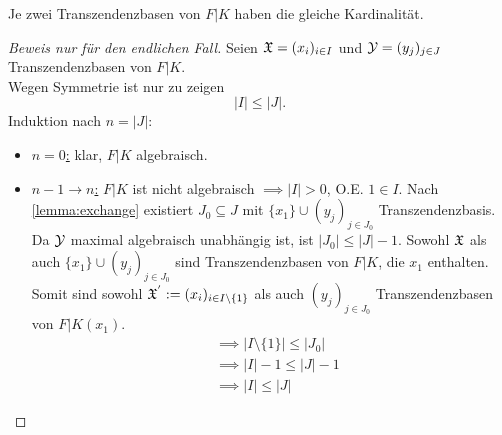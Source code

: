 \begin{satz}[Steinitz, 1910]
    Je zwei Transzendenzbasen von $F|K$ haben die gleiche Kardinalität.
\end{satz}

\begin{proof}[Beweis nur für den endlichen Fall]
    Seien $\mathfrak{X}=(x_i)_{i \in I}$ und $\mathcal{Y} = (y_j)_{j \in J}$ Transzendenzbasen von $F|K$.\\
    Wegen Symmetrie ist nur zu zeigen
    $$ |I| \leq |J|. $$
    Induktion nach $n = |J|$:
    \begin{itemize}[label=]
        \item \underline{$n=0$:} klar, $F|K$ algebraisch.
        \item  \underline{$n-1 \to n$:} $F|K$ ist nicht algebraisch 
        $\implies |I| > 0$, O.E. $1 \in I$. Nach \cref{lemma:exchange} existiert $J_0 \subseteq J$ mit
        $\{x_1\} \cup (y_j)_{j\in J_0}$ Transzendenzbasis. 
        Da $\mathcal{Y}$ maximal algebraisch unabhängig ist, ist $|J_0| \leq |J| -1$.
        Sowohl $\mathfrak{X}$ als auch $\{x_1\} \cup (y_j)_{j \in J_0}$ sind Transzendenzbasen von $F|K$, die $x_1$ enthalten.
        Somit sind sowohl $\mathfrak{X}^{'}:= (x_i)_{i \in I\setminus \{1\}}$ als auch $(y_j)_{j \in J_0}$ Transzendenzbasen von $F|K(x_1)$.
        \begin{align*}
            &\implies |I \setminus\{1\}| \leq |J_0| \\
            &\implies |I| -1 \leq |J| -1 \\
            &\implies |I| \leq |J|            
        \end{align*}
    \end{itemize}
\end{proof}
